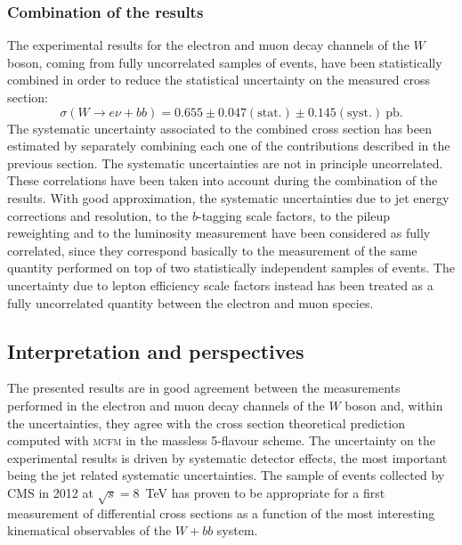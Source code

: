 \subsubsection{Combination of the results}

The experimental results for the electron and muon decay channels
of the $W$ boson, coming from fully uncorrelated samples of events, 
have been statistically combined in order to reduce the statistical 
uncertainty on the measured cross section:
$$\sigma (W \rightarrow e \nu + bb) = 0.655 \pm 0.047\mathrm{(stat.)} \pm 0.145\mathrm{(syst.)}~\mathrm{pb.}$$
The systematic uncertainty associated to the combined cross section 
has been estimated by separately combining each one of the contributions
described in the previous section.
The systematic uncertainties are not in principle uncorrelated. 
These correlations have been taken into account during the combination 
of the results.
With good approximation, the systematic uncertainties due to 
jet energy corrections and resolution, to the $b$-tagging scale factors, to the 
pileup reweighting and to the luminosity measurement have been 
considered as fully correlated, since they correspond basically to the 
measurement of the same quantity performed on top of two statistically independent 
samples of events.
The uncertainty due to lepton efficiency scale factors instead has been treated as a 
fully uncorrelated quantity between the electron and muon species.

\subsection{Interpretation and perspectives}

The presented results are in good agreement between the measurements performed
in the electron and muon decay channels of the $W$ boson and, within the 
uncertainties, they agree with the cross section theoretical 
prediction computed with \textsc{mcfm} in the massless 5-flavour scheme.
The uncertainty on the experimental results is driven by systematic detector effects,
the most important being the jet related systematic uncertainties.
The sample of events collected by CMS in 2012 at $\sqrt{s}=8$~TeV has proven to be 
appropriate for a first measurement of differential cross sections as a function of the 
most interesting kinematical observables of the $W+bb$ system. 

